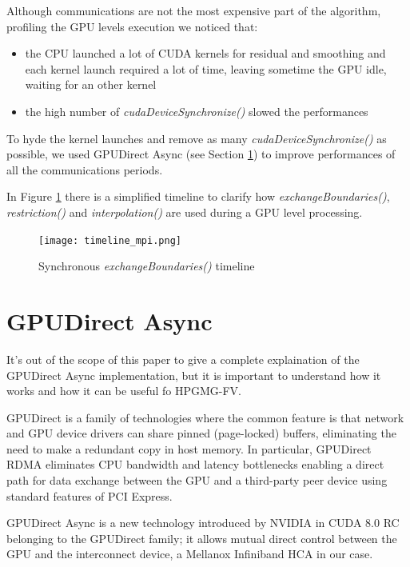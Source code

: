 \documentclass[conference]{IEEEtran}
\begin{document}
Although communications are not the most expensive part of the algorithm, profiling the GPU levels execution we noticed that:

\begin{itemize}
\item the CPU launched a lot of CUDA kernels for residual and smoothing and each kernel launch required a lot of time, leaving sometime the GPU idle, waiting for an other kernel
\item the high number of \textit{cudaDeviceSynchronize()} slowed the performances 
\end{itemize}

To hyde the kernel launches and remove as many   \textit{cudaDeviceSynchronize()} as possible, we used GPUDirect Async (see Section \ref{sec:gpudirect_async}) to improve performances of all the communications periods.

In Figure \ref{fig:timeline_mpi} there is a simplified timeline to clarify how \textit{exchangeBoundaries()}, \textit{restriction()} and \textit{interpolation()} are used during a GPU level processing.

\begin{figure}[h]
\centering
\texttt{[image: timeline\_mpi.png]}
\caption{Synchronous \textit{exchangeBoundaries()} timeline}
\label{fig:timeline_mpi}
\end{figure}

\section{GPUDirect Async}\label{sec:gpudirect_async}

It's out of the scope of this paper to give a complete explaination of the GPUDirect Async implementation, but it is important to understand how it works and how it can be useful fo HPGMG-FV.

GPUDirect \cite{GPUDirect} is a family of technologies where the common feature is that network and GPU device drivers can share pinned (page-locked) buffers, eliminating the need to make a redundant copy in host memory. In particular, GPUDirect RDMA eliminates CPU bandwidth and latency bottlenecks enabling a direct path for data exchange between the GPU and a third-party peer device using standard features of PCI Express.

GPUDirect Async is a new technology introduced by NVIDIA in CUDA 8.0 RC belonging to the GPUDirect family; it allows mutual direct control between the GPU and the interconnect device, a Mellanox Infiniband HCA in our case.
\end{document}
